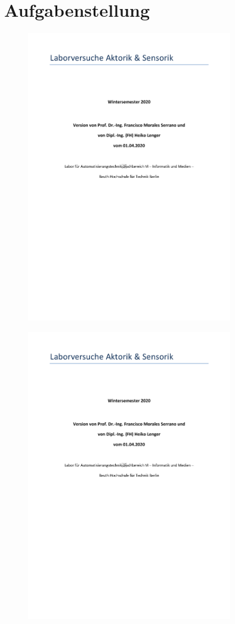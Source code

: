 \section*{Aufgabenstellung}

\begin{figure}[htp]
    \centering
    \includegraphics[page=3, width=0.8\textwidth]{../Aufgabenstellung.pdf}
    \label{fig:Aufgabenstellung A1}
\end{figure}

\begin{figure}[t]
    \centering
    \includegraphics[page=4, width=0.8\textwidth]{../Aufgabenstellung.pdf}
    \label{fig:Aufgabenstellung A1}
\end{figure}
